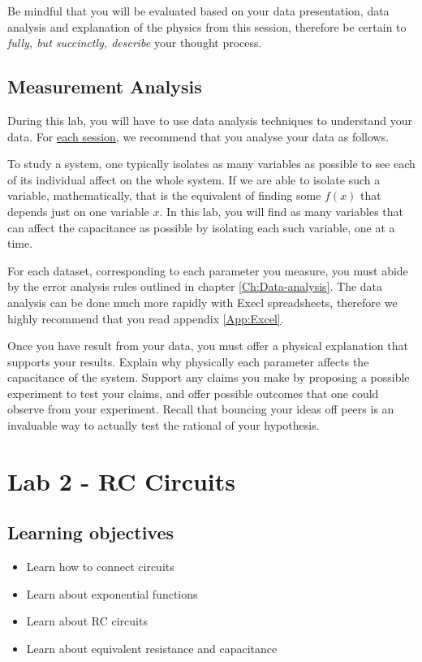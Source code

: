 \documentclass[12pt]{report}
\begin{document}
{\color{blue}Be mindful that you will be evaluated based on your data presentation, data analysis and explanation of the physics from this session, therefore be certain to \textit{fully, but succinctly, describe} your thought process.} 

\section{Measurement Analysis}
\label{Sec:lab1-analysis}
During this lab, you will have to use data analysis techniques to understand your data. For \underline{each session}, we recommend that you analyse your data as follows.

To study a system, one typically isolates as many variables as possible to see each of its individual affect on the whole system. If we are able to isolate such a variable, mathematically, that is the equivalent of finding some $f(x)$ that depends just on one variable $x$. In this lab, you will find as many variables that can affect the capacitance as possible by isolating each such variable, one at a time.

For each dataset, corresponding to each parameter you measure, you must abide by the error analysis rules outlined in chapter \ref{Ch:Data-analysis}. 
The data analysis can be done much more rapidly with Execl spreadsheets, therefore we highly recommend that you read appendix \ref{App:Excel}. 

Once you have  result from your data, you must offer a physical explanation that supports your results. {\color{blue} Explain why physically each parameter affects the capacitance of the system. Support any claims you make by proposing a possible experiment to test your claims, and offer possible outcomes that one could observe from your experiment.} Recall that bouncing your ideas off peers is an invaluable way to actually test the rational of your hypothesis.

\chapter{Lab 2 - RC Circuits}
\section{Learning objectives}
\begin{itemize}
\item Learn how to connect circuits
\item Learn about exponential functions
\item Learn about RC circuits
\item Learn about equivalent resistance and capacitance
\end{itemize}
\end{document}
